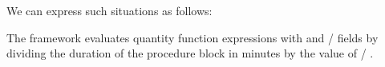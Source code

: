 We can express such situations as follows:

The framework evaluates quantity function expressions with  and  /  fields by dividing the duration of the procedure block in minutes by the value of  / .

